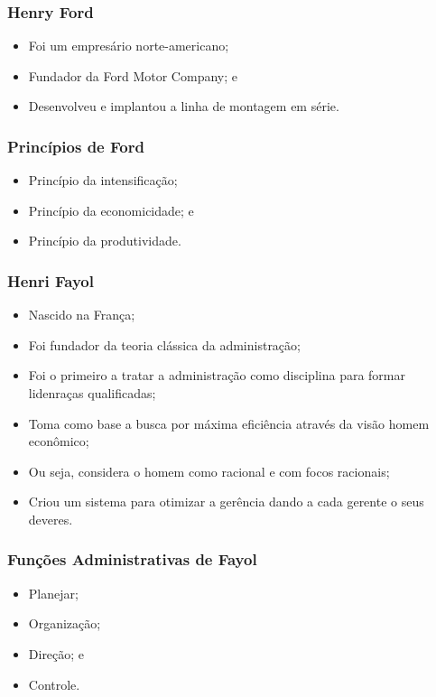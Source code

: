 \documentclass[aspectratio=169]{beamer}
\begin{document}
\begin{frame}
	\frametitle{Henry Ford}

	\begin{itemize}
		\item Foi um empresário norte-americano;
		\item Fundador da Ford Motor Company; e
		\item Desenvolveu e implantou a linha de montagem em série.
	\end{itemize}
\end{frame}

\begin{frame}
	\frametitle{Princípios de Ford }

	\begin{itemize}
		\item Princípio da intensifica\c cão;
		\item Princípio da economicidade; e
		\item Princípio da produtividade.
	\end{itemize}
\end{frame}

\begin{frame}
	\frametitle{Henri Fayol}

	\begin{itemize}
		\item Nascido na Fran\c ca;
		\item Foi fundador da teoria clássica da administra\c cão;
		\item Foi o primeiro a tratar a administra\c cão como disciplina para formar lidenra\c cas qualificadas;
		\item Toma como base a busca por máxima eficiência através da visão homem econômico;
		\item Ou seja, considera o homem como racional e com focos racionais;
		\item Criou um sistema para otimizar a gerência dando a cada gerente o seus deveres.
	\end{itemize}
\end{frame}

\begin{frame}
	\frametitle{Fun\c cões Administrativas de Fayol}

	\begin{itemize}
		\item Planejar;
		\item Organiza\c cão;
		\item Dire\c cão; e
		\item Controle.
	\end{itemize}
\end{frame}
\end{document}
